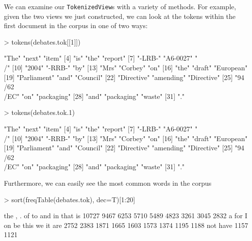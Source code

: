 \documentclass[11pt]{article}
\let\rclass=\texttt
\begin{document}
We can examine our \rclass{TokenizedView}s with a variety of
methods.  For example, given the two views we just constructed, we can
look at the tokens within the first document in the corpus in one of
two ways:
\begin{Schunk}
\begin{Sinput}
> tokens(debates.tok[[1]])
\end{Sinput}
\begin{Soutput}
 [1] "The"          "next"         "item"        
 [4] "is"           "the"          "report"      
 [7] "-LRB-"        "A6-0027"      "\\/"         
[10] "2004"         "-RRB-"        "by"          
[13] "Mrs"          "Corbey"       "on"          
[16] "the"          "draft"        "European"    
[19] "Parliament"   "and"          "Council"     
[22] "Directive"    "amending"     "Directive"   
[25] "94\\/62\\/EC" "on"           "packaging"   
[28] "and"          "packaging"    "waste"       
[31] "."           
\end{Soutput}
\begin{Sinput}
> tokens(debates.tok.1)
\end{Sinput}
\begin{Soutput}
 [1] "The"          "next"         "item"        
 [4] "is"           "the"          "report"      
 [7] "-LRB-"        "A6-0027"      "\\/"         
[10] "2004"         "-RRB-"        "by"          
[13] "Mrs"          "Corbey"       "on"          
[16] "the"          "draft"        "European"    
[19] "Parliament"   "and"          "Council"     
[22] "Directive"    "amending"     "Directive"   
[25] "94\\/62\\/EC" "on"           "packaging"   
[28] "and"          "packaging"    "waste"       
[31] "."           
\end{Soutput}
\end{Schunk}
Furthermore, we can easily see the most common words in the corpus
\begin{Schunk}
\begin{Sinput}
> sort(freqTable(debates.tok), dec=T)[1:20]
\end{Sinput}
\begin{Soutput}
  the     ,     .    of    to   and    in  that    is 
10727  9467  6253  5710  5489  4823  3261  3045  2832 
    a   for     I    on    be  this    we    it   are 
 2752  2383  1871  1665  1603  1573  1374  1195  1188 
  not  have 
 1157  1121 
\end{Soutput}
\end{Schunk}
\end{document}
